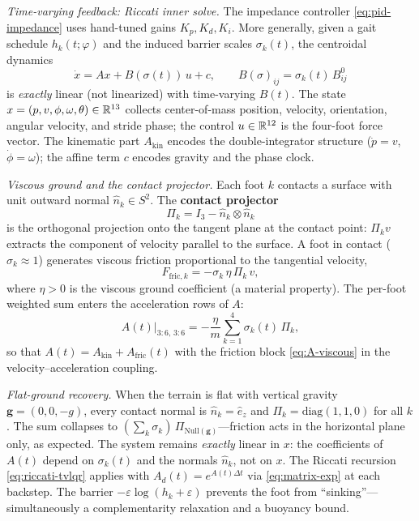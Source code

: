 \medskip\noindent\emph{Time-varying feedback: Riccati inner solve.}
The impedance controller \eqref{eq:pid-impedance} uses hand-tuned gains
$K_p, K_d, K_i$.
More generally, given a gait schedule $h_k(t;\varphi)$ and the induced
barrier scales $\sigma_k(t)$, the centroidal dynamics
\[
\dot{x} = Ax + B(\sigma(t))\,u + c, \qquad
B(\sigma)_{ij} = \sigma_k(t)\,B^0_{ij}
\]
is \emph{exactly} linear (not linearized) with time-varying $B(t)$.
The state $x = (p, v, \phi, \omega, \theta) \in \mathbb{R}^{13}$ collects
center-of-mass position, velocity, orientation, angular velocity, and stride
phase; the control $u \in \mathbb{R}^{12}$ is the four-foot force vector.
The kinematic part $A_{\mathrm{kin}}$ encodes the double-integrator structure
($\dot{p} = v$, $\dot{\phi} = \omega$); the affine term $c$ encodes gravity
and the phase clock.

\medskip\noindent\emph{Viscous ground and the contact projector.}
Each foot $k$ contacts a surface with unit outward normal
$\hat{n}_k \in S^2$.
The \textbf{contact projector}
\begin{equation}\label{eq:contact-projector}
  \Pi_k = I_3 - \hat{n}_k \otimes \hat{n}_k
\end{equation}
is the orthogonal projection onto the tangent plane at the contact point:
$\Pi_k v$ extracts the component of velocity parallel to the surface.
A foot in contact ($\sigma_k \approx 1$) generates viscous friction
proportional to the tangential velocity,
\begin{equation}\label{eq:viscous-friction}
  F_{\mathrm{fric},k} = -\sigma_k\,\eta\,\Pi_k\,v,
\end{equation}
where $\eta > 0$ is the viscous ground coefficient (a material property).
The per-foot weighted sum enters the acceleration rows of $A$:
\begin{equation}\label{eq:A-viscous}
  A(t)\big|_{3{:}6,\,3{:}6}
  = -\frac{\eta}{m}\sum_{k=1}^{4}\sigma_k(t)\,\Pi_k,
\end{equation}
so that $A(t) = A_{\mathrm{kin}} + A_{\mathrm{fric}}(t)$ with the
friction block \eqref{eq:A-viscous} in the velocity--acceleration coupling.

\smallskip\noindent\emph{Flat-ground recovery.}
When the terrain is flat with vertical gravity
$\mathbf{g} = (0,0,-g)$, every contact normal is
$\hat{n}_k = \hat{e}_z$ and
$\Pi_k = \mathrm{diag}(1,1,0)$ for all $k$.
The sum collapses to
$(\sum_k \sigma_k)\,\Pi_{\mathrm{Null}(\mathbf{g})}$---friction
acts in the horizontal plane only, as expected.
The system remains \emph{exactly} linear in $x$: the coefficients
of $A(t)$ depend on $\sigma_k(t)$ and the normals $\hat{n}_k$,
not on $x$.
The Riccati recursion \eqref{eq:riccati-tvlqr} applies with
$A_d(t) = e^{A(t)\Delta t}$ via \eqref{eq:matrix-exp} at each backstep.
The barrier $-\varepsilon\log(h_k + \varepsilon)$ prevents the foot
from ``sinking''---simultaneously a complementarity relaxation and
a buoyancy bound.

